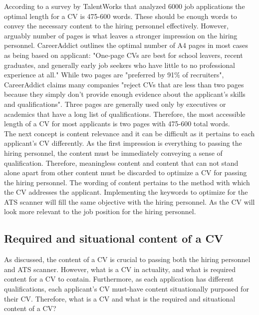 According to a survey by TalentWorks that analyzed 6000 job applications the optimal length for a CV is 475-600 words.\cite{CV_Word_length}
These should be enough words to convey the necessary content to the hiring personnel effectively. 
However, arguably number of pages is what leaves a stronger impression on the hiring personnel.
CareerAddict outlines the optimal number of A4 pages in most cases as being based on applicant:\cite{CV_Page_length}
"One-page CVs are best for school leavers, recent graduates, and generally early job seekers who have little to no professional experience at all."\cite{CV_Page_length}
While two pages are "preferred by 91\% of recruiters", CareerAddict claims many companies "reject CVs that are less than two pages because they simply don’t provide enough evidence about the applicant’s skills and qualifications".\cite{CV_Page_length}
Three pages are generally used only by executives or academics that have a long list of qualifications.
Therefore, the most accessible length of a CV for most applicants is two pages with 475-600 total words. \\

The next concept is content relevance and it can be difficult as it pertains to each applicant's CV differently.
As the first impression is everything to passing the hiring personnel, the content must be immediately conveying a sense of qualification.
Therefore, meaningless content and content that can not stand alone apart from other content must be discarded to optimize a CV for passing the hiring personnel.
The wording of content pertains to the method with which the CV addresses the applicant.
Implementing the keywords to optimize for the ATS scanner will fill the same objective with the hiring personnel.
As the CV will look more relevant to the job position for the hiring personnel.\\

\subsection{Required and situational content of a CV} \label{Required and situational content of a CV}
As discussed, the content of a CV is crucial to passing both the hiring personnel and ATS scanner.
However, what is a CV in actuality, and what is required content for a CV to contain.
Furthermore, as each application has different qualifications, each applicant's CV must-have content situationally purposed for their CV.
Therefore, what is a CV and what is the required and situational content of a CV? \\

